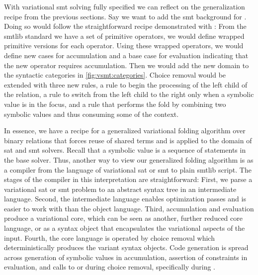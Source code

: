 \label{section:vsmt:arrays}
%
With variational \ac{smt} solving fully specified we can reflect on the
generalization recipe from the previous sections. Say we want to add the
\ac{smt} background for . Doing so would follow the straightforward
recipe demonstrated with : From the \acl{smtlib} standard we have a set
of primitive operators, we would define wrapped primitive versions for each
operator. Using these wrapped operators, we would define new cases for
accumulation and a base case for evaluation indicating that the new operator
requires accumulation. Then we would add the new domain to the syntactic
categories in \autoref{fig:vsmt:categories}. Choice removal would be extended
with three new rules, a rule to begin the processing of the left child of the
relation, a rule to switch from the left child to the right only when a symbolic
value is in the focus, and a rule that performs the fold by combining two
symbolic values and thus consuming some of the context.

In essence, we have a recipe for a generalized variational folding algorithm
over binary relations that forces reuse of shared terms and is applied to the
domain of \ac{sat} and \ac{smt} solvers. Recall that a symbolic value is a
sequence of statements in the base solver. Thus, another way to view our
generalized folding algorithm is as a compiler from the language of variational
\ac{sat} or \ac{smt} to plain \acl{smtlib} script. The stages of the compiler in
this interpretation are straightforward: First, we parse a variational \ac{sat}
or \ac{smt} problem to an abstract syntax tree in an intermediate language.
Second, the intermediate language enables optimization passes and is easier to
work with than the object language. Third, accumulation and evaluation produce a
variational core, which can be seen as another, further reduced core language,
or as a syntax object that encapsulates the variational aspects of the input.
Fourth, the core language is operated by choice removal which deterministically
produces the variant syntax objects. Code generation is spread across generation
of symbolic values in accumulation, assertion of constraints in evaluation, and
calls to  or  during choice removal, specifically during
\crChc{}.

